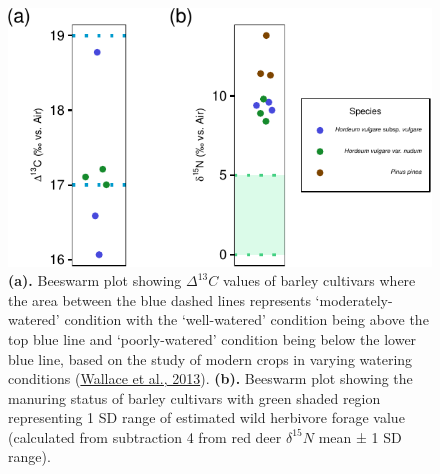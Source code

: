 \documentclass[3p]{elsarticle} %
\begin{document}
\begin{figure}
\centering
\includegraphics{castro_main_body_files/figure-latex/iso-hord-plots-1.pdf}
\caption{\label{fig:iso-hord-plots}\textbf{(a).} Beeswarm plot showing \(\Delta ^{13}C\) values of barley cultivars where the area between the blue dashed lines represents `moderately-watered' condition with the `well-watered' condition being above the top blue line and `poorly-watered' condition being below the lower blue line, based on the study of modern crops in varying watering conditions (\protect\hyperlink{ref-wallace_etal13}{Wallace et al., 2013}). \textbf{(b).} Beeswarm plot showing the manuring status of barley cultivars with green shaded region representing 1 SD range of estimated wild herbivore forage value (calculated from subtraction 4 \text{\textperthousand} from red deer \(\delta ^{15}N\) mean ± 1 SD range).}
\end{figure}
\end{document}
